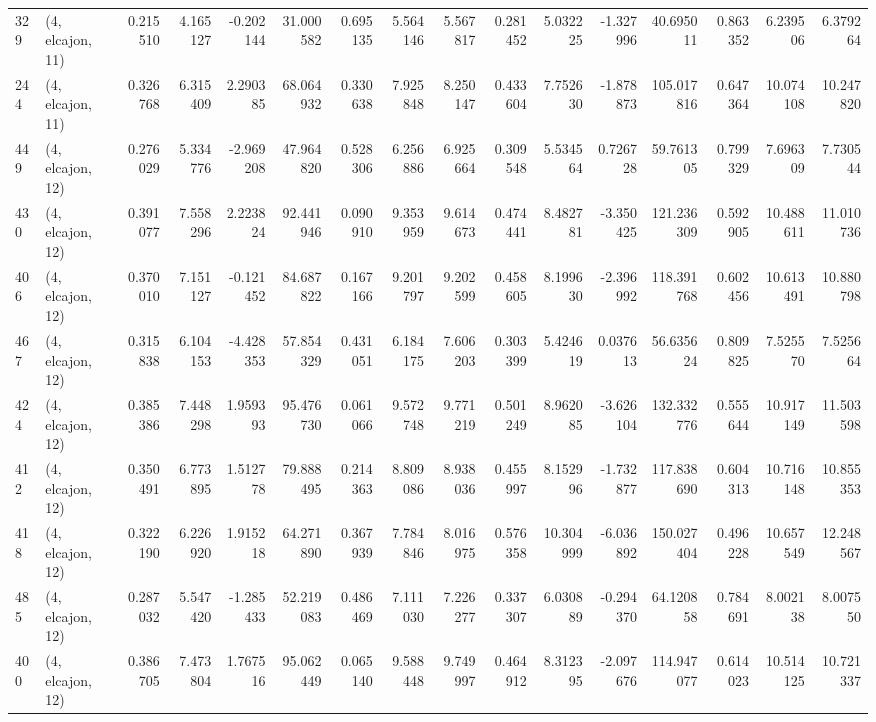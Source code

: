 \begin{tabular}{llrrrrrrrrrrrrrr}
329 &  (4, elcajon, 11) &   0.215510 &   4.165127 &  -0.202144 &    31.000582 &   0.695135 &   5.564146 &   5.567817 &  0.281452 &   5.032225 &  -1.327996 &    40.695011 &  0.863352 &   6.239506 &   6.379264 \\
244 &  (4, elcajon, 11) &   0.326768 &   6.315409 &   2.290385 &    68.064932 &   0.330638 &   7.925848 &   8.250147 &  0.433604 &   7.752630 &  -1.878873 &   105.017816 &  0.647364 &  10.074108 &  10.247820 \\
449 &  (4, elcajon, 12) &   0.276029 &   5.334776 &  -2.969208 &    47.964820 &   0.528306 &   6.256886 &   6.925664 &  0.309548 &   5.534564 &   0.726728 &    59.761305 &  0.799329 &   7.696309 &   7.730544 \\
430 &  (4, elcajon, 12) &   0.391077 &   7.558296 &   2.223824 &    92.441946 &   0.090910 &   9.353959 &   9.614673 &  0.474441 &   8.482781 &  -3.350425 &   121.236309 &  0.592905 &  10.488611 &  11.010736 \\
406 &  (4, elcajon, 12) &   0.370010 &   7.151127 &  -0.121452 &    84.687822 &   0.167166 &   9.201797 &   9.202599 &  0.458605 &   8.199630 &  -2.396992 &   118.391768 &  0.602456 &  10.613491 &  10.880798 \\
467 &  (4, elcajon, 12) &   0.315838 &   6.104153 &  -4.428353 &    57.854329 &   0.431051 &   6.184175 &   7.606203 &  0.303399 &   5.424619 &   0.037613 &    56.635624 &  0.809825 &   7.525570 &   7.525664 \\
424 &  (4, elcajon, 12) &   0.385386 &   7.448298 &   1.959393 &    95.476730 &   0.061066 &   9.572748 &   9.771219 &  0.501249 &   8.962085 &  -3.626104 &   132.332776 &  0.555644 &  10.917149 &  11.503598 \\
412 &  (4, elcajon, 12) &   0.350491 &   6.773895 &   1.512778 &    79.888495 &   0.214363 &   8.809086 &   8.938036 &  0.455997 &   8.152996 &  -1.732877 &   117.838690 &  0.604313 &  10.716148 &  10.855353 \\
418 &  (4, elcajon, 12) &   0.322190 &   6.226920 &   1.915218 &    64.271890 &   0.367939 &   7.784846 &   8.016975 &  0.576358 &  10.304999 &  -6.036892 &   150.027404 &  0.496228 &  10.657549 &  12.248567 \\
485 &  (4, elcajon, 12) &   0.287032 &   5.547420 &  -1.285433 &    52.219083 &   0.486469 &   7.111030 &   7.226277 &  0.337307 &   6.030889 &  -0.294370 &    64.120858 &  0.784691 &   8.002138 &   8.007550 \\
400 &  (4, elcajon, 12) &   0.386705 &   7.473804 &   1.767516 &    95.062449 &   0.065140 &   9.588448 &   9.749997 &  0.464912 &   8.312395 &  -2.097676 &   114.947077 &  0.614023 &  10.514125 &  10.721337 \\

\end{tabular}
